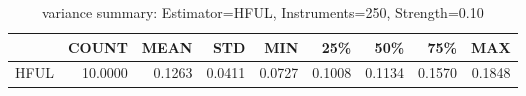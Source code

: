 \begin{table}[ht]
\centering
\caption{variance summary: Estimator=HFUL, Instruments=250, Strength=0.10}
\begin{tabular}{lrrrrrrrr}
\toprule
 & COUNT & MEAN & STD & MIN & 25\% & 50\% & 75\% & MAX \\
\midrule
HFUL & 10.0000 & 0.1263 & 0.0411 & 0.0727 & 0.1008 & 0.1134 & 0.1570 & 0.1848 \\
\bottomrule
\end{tabular}
\end{table}
